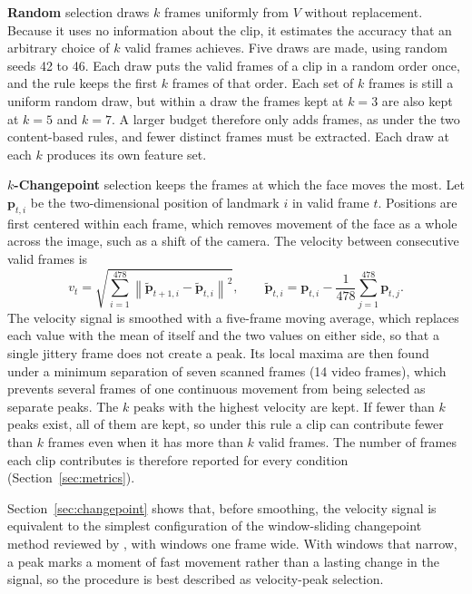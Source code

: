 \textbf{Random} selection draws $k$ frames uniformly from $V$ without replacement. Because it uses no information about the clip, it estimates the accuracy that an arbitrary choice of $k$ valid frames achieves. Five draws are made, using random seeds 42 to 46. Each draw puts the valid frames of a clip in a random order once, and the rule keeps the first $k$ frames of that order. Each set of $k$ frames is still a uniform random draw, but within a draw the frames kept at $k = 3$ are also kept at $k = 5$ and $k = 7$. A larger budget therefore only adds frames, as under the two content-based rules, and fewer distinct frames must be extracted. Each draw at each $k$ produces its own feature set.

\textbf{$k$-Changepoint} selection keeps the frames at which the face moves the most. Let $\mathbf{p}_{t,i}$ be the two-dimensional position of landmark $i$ in valid frame $t$. Positions are first centered within each frame, which removes movement of the face as a whole across the image, such as a shift of the camera. The velocity between consecutive valid frames is
\begin{equation}
   v_t = \sqrt{\sum_{i=1}^{478} \left\lVert \tilde{\mathbf{p}}_{t+1,i} - \tilde{\mathbf{p}}_{t,i} \right\rVert^2},
   \qquad
   \tilde{\mathbf{p}}_{t,i} = \mathbf{p}_{t,i} - \frac{1}{478} \sum_{j=1}^{478} \mathbf{p}_{t,j}.
   \label{eq:velocity}
\end{equation}
The velocity signal is smoothed with a five-frame moving average, which replaces each value with the mean of itself and the two values on either side, so that a single jittery frame does not create a peak. Its local maxima are then found under a minimum separation of seven scanned frames (14 video frames), which prevents several frames of one continuous movement from being selected as separate peaks. The $k$ peaks with the highest velocity are kept. If fewer than $k$ peaks exist, all of them are kept, so under this rule a clip can contribute fewer than $k$ frames even when it has more than $k$ valid frames. The number of frames each clip contributes is therefore reported for every condition (Section~\ref{sec:metrics}).

Section~\ref{sec:changepoint} shows that, before smoothing, the velocity signal is equivalent to the simplest configuration of the window-sliding changepoint method reviewed by , with windows one frame wide. With windows that narrow, a peak marks a moment of fast movement rather than a lasting change in the signal, so the procedure is best described as velocity-peak selection.

